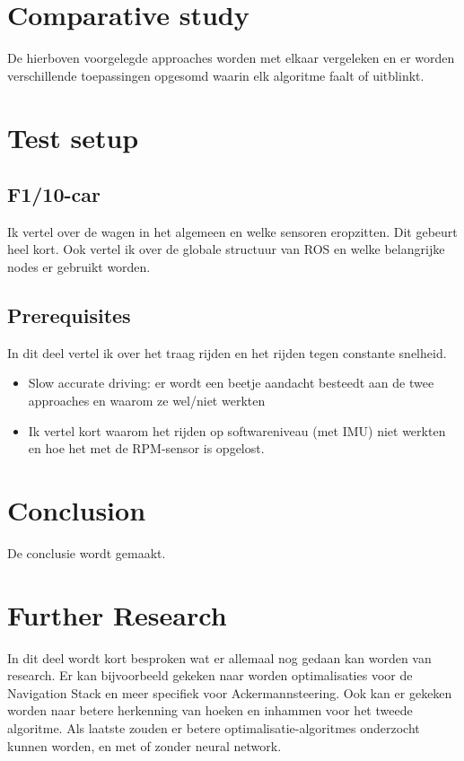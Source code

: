 \documentclass[conference,a4paper]{IEEEtran}
\begin{document}
\section{Comparative study}
De hierboven voorgelegde approaches worden met elkaar vergeleken en er worden verschillende toepassingen opgesomd waarin elk algoritme faalt of uitblinkt.

\section{Test setup}
\subsection{F1/10-car}
Ik vertel over de wagen in het algemeen en welke sensoren eropzitten. Dit gebeurt heel kort.
Ook vertel ik over de globale structuur van ROS en welke belangrijke nodes er gebruikt worden.

\subsection{Prerequisites}
In dit deel vertel ik over het traag rijden en het rijden tegen constante snelheid.
\begin{itemize}
\item Slow accurate driving: er wordt een beetje aandacht besteedt aan de twee approaches en waarom ze wel/niet werkten
\item Ik vertel kort waarom het rijden op softwareniveau (met IMU) niet werkten en hoe het met de RPM-sensor is opgelost.
\end{itemize}

\section{Conclusion}
De conclusie wordt gemaakt.

\section{Further Research}
In dit deel wordt kort besproken wat er allemaal nog gedaan kan worden van research. Er kan bijvoorbeeld gekeken naar worden optimalisaties voor de Navigation Stack en meer specifiek voor Ackermannsteering. Ook kan er gekeken worden naar betere herkenning van hoeken en inhammen voor het tweede algoritme. Als laatste zouden er betere optimalisatie-algoritmes onderzocht kunnen worden, en met of zonder neural network. 
\end{document}
